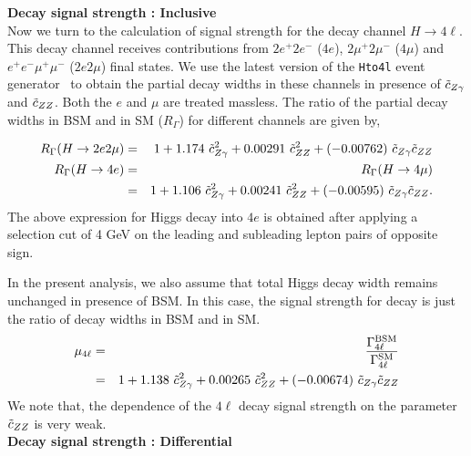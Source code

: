 {\bf Decay signal strength : Inclusive} \\


Now we turn to the calculation of signal strength for the decay channel $H \to 4\ell$. This decay 
channel receives contributions from $2e^+2e^-$ ($4e$), $2\mu^+ 2\mu^-$ ($4\mu$) and $e^+e^-\mu^+\mu^-$ ($2e2\mu$) final states.
We use the latest version of the {\tt Hto4l} event generator~\cite{Boselli:2017pef} to obtain the partial decay widths in these 
channels in presence of $\tilde c_{Z\gamma}$ and $\tilde c_{ZZ}$. Both the $e$ and $\mu$ are treated massless. The ratio of the partial decay widths in BSM and in SM ($R_\Gamma$) for different channels are given by, 

{
\begin{eqnarray}
 R_{\Gamma}(H \to 2e2\mu) &=& 1  + 1.174~ \tilde c_{Z\gamma}^2 + 0.00291~ \tilde c_{ZZ}^2  
   + (-0.00762)~\tilde c_{Z\gamma}\tilde c_{ZZ} \\
 R_{\Gamma}(H \to 4e) 
 &=& R_{\Gamma}(H \to 4\mu) \nonumber \\
 &=& 1  + 1.106~ \tilde c_{Z\gamma}^2 + 0.00241~ \tilde c_{ZZ}^2 
   + (-0.00595)~\tilde c_{Z\gamma}\tilde c_{ZZ}.
\end{eqnarray}
}
The above expression for Higgs decay 
into $4e$ is obtained after applying a selection cut of { 4 GeV} on the leading and subleading lepton pairs 
of opposite sign.

In the present analysis, we also assume that total Higgs decay width remains unchanged in presence of BSM. In this
case, the signal strength for decay is just the ratio of decay widths in BSM and in SM.
{
\begin{eqnarray}\label{eq:mu4l}
 \mu_{4\ell} &=& \frac{\Gamma^{\rm BSM}_{4\ell}}{\Gamma^{\rm SM}_{4\ell}}  \nonumber \\
 &=& 1  + 1.138~ \tilde c_{Z\gamma}^2 + 
 0.00265~ \tilde c_{ZZ}^2  +
 (-0.00674)~ \tilde c_{Z\gamma} \tilde c_{ZZ} 
\end{eqnarray}
}
We note that, the dependence of the $4\ell$ decay signal strength on the parameter $\tilde c_{ZZ}$ is very weak. \\

{\bf Decay signal strength : Differential} \\

